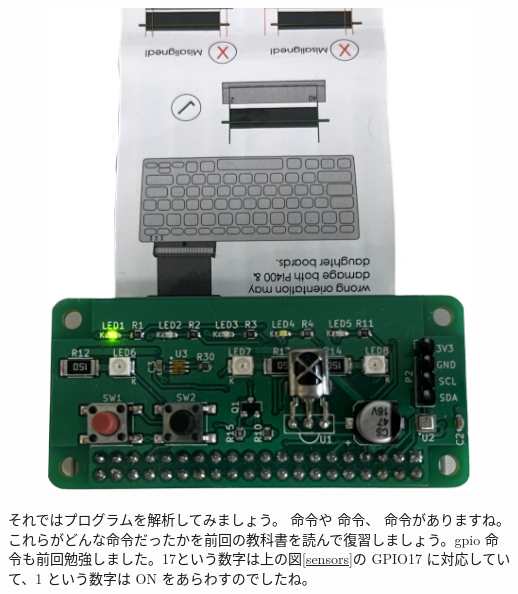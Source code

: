 \begin{figure}[H]
    \centering
    \includegraphics[width=\linewidth]{images/chap03/led_emission_demo.png}
\end{figure}

それではプログラムを解析してみましょう。 命令や  命令、  命令がありますね。これらがどんな命令だったかを前回の教科書を読んで復習しましょう。gpio 命令も前回勉強しました。17という数字は上の図\ref{sensors}の GPIO17 に対応していて、1 という数字は ON をあらわすのでしたね。\\

\begin{tcolorbox}[title=\useOmetoi]
\begin{enumerate}
\end{enumerate}
\end{tcolorbox}

